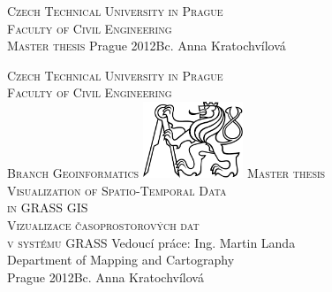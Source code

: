 \begin{center}
\newcommand{\napisCVUT}{Czech Technical University in Prague}
\newcommand{\napisFS}{Faculty of Civil Engineering}
\newcommand{\napisObor}{Branch Geoinformatics}
\newcommand{\napisKatedra}{Department of Mapping and Cartography}
\newcommand{\napisVedouci}{Ing. Martin Landa}
\newcommand{\napisAutor}{Bc. Anna Kratochvílová}
\newcommand{\napisNazevI}{Visualization of Spatio-Temporal Data}
\newcommand{\napisNazevII}{in GRASS GIS}
\newcommand{\napisNazevAJI}{Vizualizace časoprostorových dat}
\newcommand{\napisNazevAJII}{v systému GRASS}
\newcommand{\napisBakalarka}{Master thesis}
\newcommand{\napisPraha}{Prague 2012}
\newcommand{\napisDatum}{Prague 2012}
%
\newcommand{\velka}[1]{\textsc{#1}}
%
%
\newif\ifpatitul
\patitultrue


\ifpatitul
{\Large\velka{\napisCVUT}}\\
\velka{\Large\napisFS}\\
\vfill
{\LARGE\velka{\napisBakalarka}}
\vfill
{\large\napisPraha\hfill\napisAutor}
\newpage
\fi%

\cleardoublepage

{\Large\velka{\napisCVUT}}\\
{\Large\velka{\napisFS}}\\
{\Large\velka{\napisObor}}
\vfill
\includegraphics[width=3cm]{logo_cvut_black} %
\vfill
{\Large\velka{\napisBakalarka}}\\
{\Large\velka{\napisNazevI\\
\napisNazevII}}
{\\\bigskip\large\velka{\napisNazevAJI\\
\napisNazevAJII}}
\vfill
{\large%
Vedoucí práce: \napisVedouci\\
\napisKatedra\\
\bigskip
\napisDatum\hfill\napisAutor}
\end{center}
